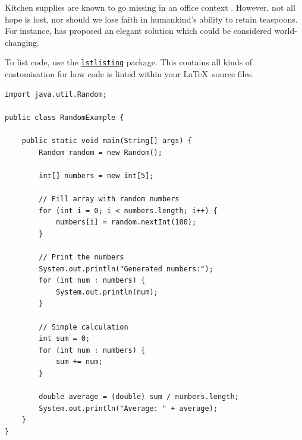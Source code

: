 Kitchen supplies are known to go missing in an office context \citep{CaseOfDisappearingTeaspoons}. However, not all hope is lost, nor should we lose faith in humankind's ability to retain teaspoons. For instance, \citet{TeaspoonSolutionProposal} has proposed an elegant solution which could be considered world-changing.

To list code, use the \href{https://www.overleaf.com/learn/latex/Code_listing#Using_listings_to_highlight_code}{\texttt{lstlisting}} package. This contains all kinds of customisation for how code is linted within your \LaTeX \ source files.

\begin{lstlisting}
import java.util.Random;

public class RandomExample {

    public static void main(String[] args) {
        Random random = new Random();

        int[] numbers = new int[5];

        // Fill array with random numbers
        for (int i = 0; i < numbers.length; i++) {
            numbers[i] = random.nextInt(100);
        }

        // Print the numbers
        System.out.println("Generated numbers:");
        for (int num : numbers) {
            System.out.println(num);
        }

        // Simple calculation
        int sum = 0;
        for (int num : numbers) {
            sum += num;
        }

        double average = (double) sum / numbers.length;
        System.out.println("Average: " + average);
    }
}
\end{lstlisting}